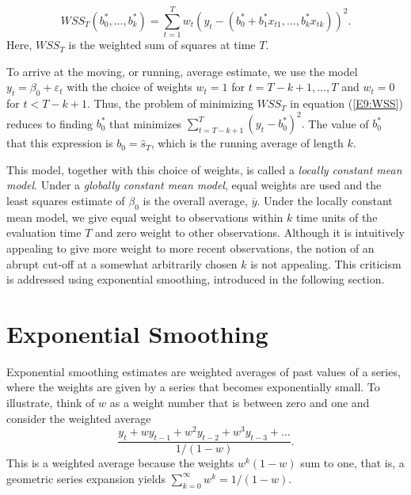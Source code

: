 
\begin{equation}\label{E9:WSS}
WSS_T\left( b_0^{\ast },\ldots, b_k^{\ast}\right) = \sum_{t=1}^{T}
w_t \left( y_t-\left( b_0^{\ast} + b_1^{\ast} x_{t1}, \ldots,
b_{k}^{\ast} x_{tk} \right) \right)^2.
\end{equation}
Here, $WSS_T$ is the weighted sum of squares at time $T$.

To arrive at the moving, or running, average estimate, we use the
model $ y_t = \beta_0 + \varepsilon_t$ with the choice of weights
$w_t=1$ for $t = T-k+1, \ldots, T$ and $w_t=0$ for $t<T-k+1$. Thus,
the problem of minimizing $WSS_T$ in equation (\ref{E9:WSS}) reduces
to finding $b_0^{\ast}$ that minimizes $\sum_{t=T-k+1}^{T}\left( y_t
- b_0^{\ast} \right)^2.$ The value of $b_0^{\ast}$ that this
expression is $b_0 = \widehat{s}_T$, which is the running average of
length $k$.

This model, together with this choice of weights, is called a
\emph{locally constant mean model}. Under a \emph{globally constant
mean model}, equal weights are used and the least squares estimate
of $\beta_0$ is the overall average, $\overline{y}$. Under the
locally constant mean model, we give equal weight to observations
within $k$ time units of the evaluation time $T$ and zero weight to
other observations. Although it is intuitively appealing to give
more weight to more recent observations, the notion of an abrupt
cut-off at a somewhat arbitrarily chosen $k$ is not appealing. This
criticism is addressed using exponential smoothing, introduced in
the following section.

\section{Exponential Smoothing}\label{S9:ExponSmooth}

Exponential smoothing estimates are weighted averages of past values
of a series, where the weights are given by a series that becomes
exponentially small. To illustrate, think of $w$ as a weight number
that is between zero and one and consider the weighted average
\begin{equation*}
\frac{y_t + w y_{t-1} + w^2 y_{t-2} + w^3 y_{t-3} +
\ldots}{1/(1-w)}.
\end{equation*}
This is a weighted average because the weights $w^k (1-w)$ sum to
one, that is, a geometric series expansion yields
$\sum_{k=0}^{\infty }w^k = 1/(1-w)$.

